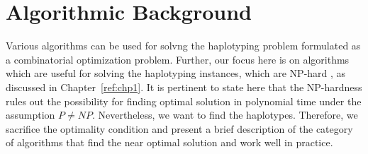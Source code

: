 \chapter{Algorithmic Background}
Various algorithms can be used for solvng the haplotyping problem formulated as a combinatorial optimization problem.
Further, our focus here is on algorithms which are useful for solving the haplotyping instances, which are NP-hard \citep{Cilibrasi2007}, as discussed in Chapter~\ref{ref:chp1}. 
It is pertinent to state here that the NP-hardness rules out the possibility for finding optimal solution in polynomial time under the assumption $P \neq NP$.
Nevertheless, we want to find the haplotypes. Therefore, we sacrifice the optimality condition and present a brief description of the category of algorithms that 
find the near optimal solution and work well in practice.


